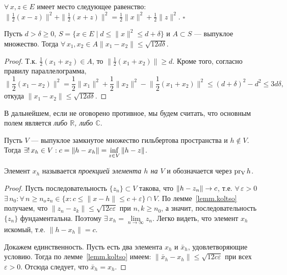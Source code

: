 \documentclass[12pt,titlepage, a4paper]{article}
\begin{document}
\begin{lemm}
$\forall\,x,z\in E$ имеет место следующее равенство: $\|\frac 1
2(x-z)\|^2+\|\frac 1 2(x+z)\|^2= \frac 1 2\|x\|^2+\frac 1 2\|z\|^2$.
\hfill{$\square$}
\end{lemm}

\begin{lemm}\label{lemm.koltso}
Пусть $d>\delta\geqslant 0$, $S=\{x\in E\mid
d\leqslant\|x\|^2\leqslant d+\delta\}$ и $A\subset S$ --- выпуклое
множество. Тогда $\forall\,x_1,x_2\in A$\;\;$\|x_1-x_2\|\leqslant
\sqrt{12d\delta}$.
\end{lemm}

\enlargethispage{\baselineskip}

\begin{proof}
Т.к. $\frac 1 2(x_1+x_2)\in A$, то $\|\frac 1 2(x_1+x_2)\|\geqslant
d$. Кроме того, согласно правилу параллелограмма,
\begin{equation*}
\Big\|\frac 1 2(x_1-x_2)\Big\|^2=\frac 1 2\|x_1\|^2+\frac 1
2\|x_2\|^2-\Big\|\frac 1
2(x_1+x_2)\Big\|^2\leqslant(d+\delta)^2-d^2\leqslant3d\delta,
\end{equation*}
откуда $\|x_1-x_2\|\leqslant\sqrt{12d\delta}$.
\end{proof}

\lecture

\vspace{-27pt}


\begin{zam}
В дальнейшем, если не оговорено противное, мы будем считать, что
основным полем является \emph{либо $\mathbb{R}$, либо $\mathbb{C}$}.
\end{zam}

\begin{predl}
Пусть $V$ --- выпуклое замкнутое множество гильбертова пространства
и $h\not\in V$. Тогда $\exists!\,x_h\in
V:c=\|h-x_h\|\p=\inf\limits_{z\in V}\|h-z\|$.
\end{predl}

\begin{defen}
Элемент $x_h$ называется \emph{проекцией элемента $h$ на $V$} и
обозначается через $\mathop{\mathrm{pr_{V}}}h$.
\end{defen}

\begin{proof}
Пусть последовательность $\{z_n\}\subset V$ такова, что
$\|h\p-z_n\|\to c$, т.е.
$\forall\,\varepsilon>0$\;\;$\exists\,n_0:\forall\,n\geqslant
n_o$\;\;$z_n\in\{x:c\leqslant\|x-h\|\leqslant c+\varepsilon\}\cap
V$. По лемме~\ref{lemm.koltso} получаем, что
$\|z_n-z_k\|\leqslant\sqrt{12c\varepsilon}$ при $n,k\geqslant n_0$,
а значит, последовательность $\{z_n\}$ фундаментальна. Поэтому
$\exists\,x_h=\lim\limits_{n\to\infty}z_n$. Легко видеть, что
элемент $x_h$ искомый, т.е. $\|h-x_h\|=c$.

Докажем единственность. Пусть есть два элемента $x_h$ и $\bar{x}_h$,
удовлетворяющие условию. Тогда по лемме~\ref{lemm.koltso} имеем:
$\|\bar{x}_h-x_h\|\leqslant\sqrt{12c\varepsilon}$ при всех
$\varepsilon>0$. Отсюда следует, что $\bar{x}_h=x_h$.
\end{proof}
\end{document}

